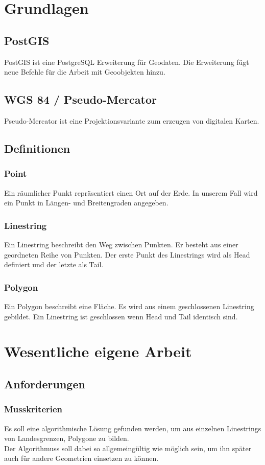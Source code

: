 \documentclass[a4paper, 12pt]{article}
\begin{document}
\section{Grundlagen}
\subsection{PostGIS}
PostGIS ist eine PostgreSQL Erweiterung für Geodaten. Die Erweiterung fügt neue Befehle für die Arbeit mit Geoobjekten hinzu\cite{pgis}.
\subsection{WGS 84 / Pseudo-Mercator}
Pseudo-Mercator ist eine Projektionsvariante zum erzeugen von digitalen Karten\cite{wgs}. 
\subsection{Definitionen}
\subsubsection{Point}
 Ein räumlicher Punkt repräsentiert einen Ort auf der Erde. In unserem Fall wird ein Punkt in Längen- und Breitengraden angegeben.\\
\subsubsection{Linestring}
 Ein Linestring beschreibt den Weg zwischen Punkten. Er besteht aus einer geordneten Reihe von Punkten. Der erste Punkt des Linestrings wird als Head definiert und der letzte als Tail.\\
\subsubsection{Polygon}
 Ein Polygon beschreibt eine Fläche. Es wird aus einem geschlossenen Linestring gebildet. Ein Linestring ist geschlossen wenn Head und Tail identisch sind\cite{geome}.

	\newpage
\section{Wesentliche eigene Arbeit}
\subsection{Anforderungen }
\subsubsection{Musskriterien}
Es soll eine algorithmische Lösung gefunden werden, um aus einzelnen Linestrings von Landesgrenzen, Polygone zu bilden. \\
Der Algorithmuss soll dabei so allgemeingültig wie möglich sein, um ihn später auch für andere Geometrien einsetzen zu können.\\
\end{document}
